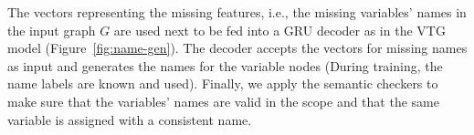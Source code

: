 The vectors representing the missing features, i.e., the missing
variables' names in the input graph $G$ are used next to be fed into a
GRU decoder as in the VTG model (Figure~\ref{fig:name-gen}). The
decoder accepts the vectors for missing names as input and generates
the names for the variable nodes (During training, the name labels are
known and used). Finally, we apply the semantic checkers to make sure
that the variables' names are valid in the scope and that the same
variable is assigned with a consistent name.










